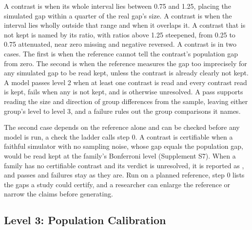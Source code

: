 A contrast is  when its whole interval lies between 0.75 and 1.25, placing the simulated gap within a quarter of the real gap's size.
A contrast is  when the interval lies wholly outside that range and  when it overlaps it.
A contrast that is not kept is named by its ratio, with ratios above 1.25 steepened, from 0.25 to 0.75 attenuated, near zero missing and negative reversed.
A contrast is  in two cases.
The first is when the reference cannot tell the contrast's population gap from zero.
The second is when the reference measures the gap too imprecisely for any simulated gap to be read kept, unless the contrast is already clearly not kept.
A model passes level 2 when at least one contrast is read and every contrast read is kept, fails when any is not kept, and is otherwise unresolved.
A pass supports reading the size and direction of group differences from the sample, leaving either group's level to level 3, and a failure rules out the group comparisons it names.

The second case depends on the reference alone and can be checked before any model is run, a check the ladder calls step 0.
A contrast is certifiable when a faithful simulator with no sampling noise, whose gap equals the population gap, would be read kept at the family's Bonferroni level (Supplement S7).
When a family has no certifiable contrast and its verdict is unresolved, it is reported as , and passes and failures stay as they are.
Run on a planned reference, step 0 lists the gaps a study could certify, and a researcher can enlarge the reference or narrow the claims before generating.

\subsection{Level 3: Population Calibration}
\label{sec:l3-method}

